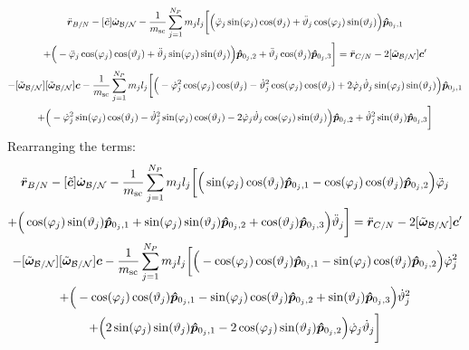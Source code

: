 \begin{multline}
	\ddot{\bm r}_{B/N}-[\tilde{\bm{c}}] \dot{\bm\omega}_{\cal B/N}-\frac{1}{m_{\text{sc}}}\sum_{j=1}^{N_{P}}m_j l_j \bigg[
	\Big(\ddot{\varphi}_j\sin(\varphi_j)\cos(\vartheta_j)+\ddot{\vartheta}_j\cos(\varphi_j)\sin(\vartheta_j)\Big)\bm{\hat{p}}_{0_j,1}\\ +\Big(-\ddot{\varphi}_j\cos(\varphi_j)\cos(\vartheta_j)+\ddot{\vartheta}_j\sin(\varphi_j)\sin(\vartheta_j)\Big)\bm{\hat{p}}_{0_j,2}+\ddot{\vartheta}_j\cos(\vartheta_j)\bm{\hat{p}}_{0_j,3}
	\bigg]= \ddot{\bm r}_{C/N} 	- 2[\tilde{\bm\omega}_{\cal B/N}] \bm c'
	\\
	-[\tilde{\bm\omega}_{\cal B/N}][\tilde{\bm\omega}_{\cal B/N}]\bm{c}
	-\frac{1}{m_{\text{sc}}}\sum_{j=1}^{N_{P}}m_j l_j \bigg[
	\Big(-\dot{\varphi}_j^2\cos(\varphi_j)\cos(\vartheta_j)-\dot{\vartheta}_j^2\cos(\varphi_j)\cos(\vartheta_j)+2\dot{\varphi}_j\dot{\vartheta}_j\sin(\varphi_j)\sin(\vartheta_j) \Big)\bm{\hat{p}}_{0_j,1} \\
	+\Big(-\dot{\varphi}_j^2\sin(\varphi_j)\cos(\vartheta_j)-\dot{\vartheta}_j^2\sin(\varphi_j)\cos(\vartheta_j)-2\dot{\varphi}_j\dot{\vartheta}_j\cos(\varphi_j)\sin(\vartheta_j) \Big)\bm{\hat{p}}_{0_j,2}
	+\dot{\vartheta}_j^2\sin(\vartheta_j)\bm{\hat{p}}_{0_j,3}
	\bigg]
	\label{eq:Rbddot3}
\end{multline}
Rearranging the terms:
\begin{multline}
	\ddot{\bm r}_{B/N}-[\tilde{\bm{c}}] \dot{\bm\omega}_{\cal B/N}-\frac{1}{m_{\text{sc}}}\sum_{j=1}^{N_{P}}m_j l_j \bigg[
	\Big(\sin(\varphi_j)\cos(\vartheta_j)\bm{\hat{p}}_{0_j,1}-\cos(\varphi_j)\cos(\vartheta_j)\bm{\hat{p}}_{0_j,2}\Big)\ddot{\varphi}_j \\+\Big(\cos(\varphi_j)\sin(\vartheta_j)\bm{\hat{p}}_{0_j,1}+\sin(\varphi_j)\sin(\vartheta_j)\bm{\hat{p}}_{0_j,2}+\cos(\vartheta_j)\bm{\hat{p}}_{0_j,3}\Big)\ddot{\vartheta}_j
	\bigg]= \ddot{\bm r}_{C/N} 	- 2[\tilde{\bm\omega}_{\cal B/N}] \bm c'
	\\-[\tilde{\bm\omega}_{\cal B/N}][\tilde{\bm\omega}_{\cal B/N}]\bm{c}
	-\frac{1}{m_{\text{sc}}}\sum_{j=1}^{N_{P}}m_j l_j \bigg[
	\Big(-\cos(\varphi_j)\cos(\vartheta_j)\bm{\hat{p}}_{0_j,1}-\sin(\varphi_j)\cos(\vartheta_j)\bm{\hat{p}}_{0_j,2}\Big)\dot{\varphi}_j^2
	\\+\Big(-\cos(\varphi_j)\cos(\vartheta_j)\bm{\hat{p}}_{0_j,1}-\sin(\varphi_j)\cos(\vartheta_j)\bm{\hat{p}}_{0_j,2}+\sin(\vartheta_j)\bm{\hat{p}}_{0_j,3} \Big)\dot{\vartheta}_j^2 \\+
	\Big(2\sin(\varphi_j)\sin(\vartheta_j)\bm{\hat{p}}_{0_j,1} -2\cos(\varphi_j)\sin(\vartheta_j)\bm{\hat{p}}_{0_j,2}\Big)\dot{\varphi}_j\dot{\vartheta}_j
	\bigg]
	\label{eq:Rbddot4}
\end{multline}

